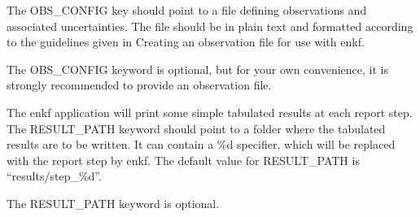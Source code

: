 \documentclass[a4paper,10pt,english]{sphinxmanual}
\begin{document}
\label{\detokenize{keywords/index:obs-config}}
\begin{sphinxShadowBox}

The OBS\_CONFIG key should point to a file defining observations and associated
uncertainties. The file should be in plain text and formatted according to the
guidelines given in Creating an observation file for use with enkf.


%
\begin{sphinxVerbatim}[commandchars=\\\{\}]
     
 
\end{sphinxVerbatim}

The OBS\_CONFIG keyword is optional, but for your own convenience, it is
strongly recommended to provide an observation file.
\end{sphinxShadowBox}
\label{\detokenize{keywords/index:result-path}}
\begin{sphinxShadowBox}

The enkf application will print some simple tabulated results at each report
step. The RESULT\_PATH keyword should point to a folder where the tabulated
results are to be written. It can contain a \%d specifier, which will be
replaced with the report step by enkf. The default value for RESULT\_PATH is
“results/step\_\%d”.


%
\begin{sphinxVerbatim}[commandchars=\\\{\}]
  
 
\end{sphinxVerbatim}

The RESULT\_PATH keyword is optional.
\end{sphinxShadowBox}
\label{\detokenize{keywords/index:runpath}}
\end{document}
